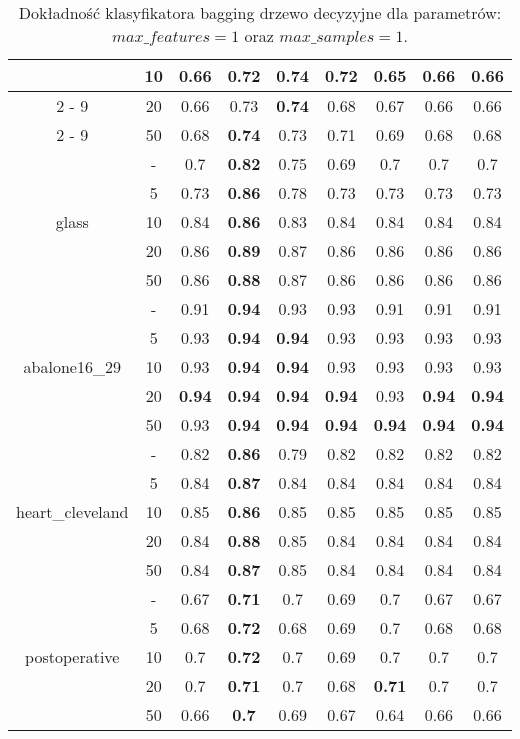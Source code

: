 \begin{table}[H]
\begin{center}
{\begin{tabular}{c|c|ccccccc}
			&10&0.66&0.72&\textbf{0.74}&0.72&0.65&0.66&0.66\\%
			\cline{2%
				-%
				9}%
			&20&0.66&0.73&\textbf{0.74}&0.68&0.67&0.66&0.66\\%
			\cline{2%
				-%
				9}%
			&50&0.68&\textbf{0.74}&0.73&0.71&0.69&0.68&0.68\\%
			\hline%
			\multirow{5}{*}{glass}&{-}&0.7&\textbf{0.82}&0.75&0.69&0.7&0.7&0.7\\%
			\cline{2%
				-%
				9}%
			&5&0.73&\textbf{0.86}&0.78&0.73&0.73&0.73&0.73\\%
			\cline{2%
				-%
				9}%
			&10&0.84&\textbf{0.86}&0.83&0.84&0.84&0.84&0.84\\%
			\cline{2%
				-%
				9}%
			&20&0.86&\textbf{0.89}&0.87&0.86&0.86&0.86&0.86\\%
			\cline{2%
				-%
				9}%
			&50&0.86&\textbf{0.88}&0.87&0.86&0.86&0.86&0.86\\%
			\hline%
			\multirow{5}{*}{abalone16\_29}&{-}&0.91&\textbf{0.94}&0.93&0.93&0.91&0.91&0.91\\%
			\cline{2%
				-%
				9}%
			&5&0.93&\textbf{0.94}&\textbf{0.94}&0.93&0.93&0.93&0.93\\%
			\cline{2%
				-%
				9}%
			&10&0.93&\textbf{0.94}&\textbf{0.94}&0.93&0.93&0.93&0.93\\%
			\cline{2%
				-%
				9}%
			&20&\textbf{0.94}&\textbf{0.94}&\textbf{0.94}&\textbf{0.94}&0.93&\textbf{0.94}&\textbf{0.94}\\%
			\cline{2%
				-%
				9}%
			&50&0.93&\textbf{0.94}&\textbf{0.94}&\textbf{0.94}&\textbf{0.94}&\textbf{0.94}&\textbf{0.94}\\%
			\hline%
			\multirow{5}{*}{heart\_cleveland}&{-}&0.82&\textbf{0.86}&0.79&0.82&0.82&0.82&0.82\\%
			\cline{2%
				-%
				9}%
			&5&0.84&\textbf{0.87}&0.84&0.84&0.84&0.84&0.84\\%
			\cline{2%
				-%
				9}%
			&10&0.85&\textbf{0.86}&0.85&0.85&0.85&0.85&0.85\\%
			\cline{2%
				-%
				9}%
			&20&0.84&\textbf{0.88}&0.85&0.84&0.84&0.84&0.84\\%
			\cline{2%
				-%
				9}%
			&50&0.84&\textbf{0.87}&0.85&0.84&0.84&0.84&0.84\\%
			\hline%
			\multirow{5}{*}{postoperative}&{-}&0.67&\textbf{0.71}&0.7&0.69&0.7&0.67&0.67\\%
			\cline{2%
				-%
				9}%
			&5&0.68&\textbf{0.72}&0.68&0.69&0.7&0.68&0.68\\%
			\cline{2%
				-%
				9}%
			&10&0.7&\textbf{0.72}&0.7&0.69&0.7&0.7&0.7\\%
			\cline{2%
				-%
				9}%
			&20&0.7&\textbf{0.71}&0.7&0.68&\textbf{0.71}&0.7&0.7\\%
			\cline{2%
				-%
				9}%
			&50&0.66&\textbf{0.7}&0.69&0.67&0.64&0.66&0.66\\%
			\hline%
		\end{tabular}}
			\caption{Dokładność klasyfikatora bagging drzewo decyzyjne dla parametrów: $max\_features = 1$ oraz $max\_samples = 1$.}
			\label{baggingdrzewoacc}
		\end{center}
	\end{table}

